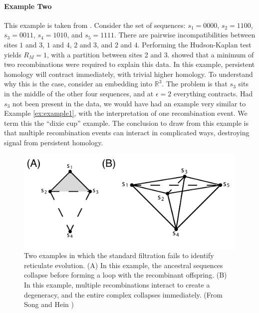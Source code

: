 \paragraph{Example Two}
\label{ex:example2}
%
This example is taken from \citet{Song:2005}.
Consider the set of sequences: $s_{1}=0000$, $s_{2}=1100$, $s_{3}=0011$, $s_{4}=1010$, and $s_{5}=1111$.
There are pairwise incompatibilities between sites $1$ and $3$, $1$ and $4$, $2$ and $3$, and $2$ and $4$.
Performing the Hudson-Kaplan test yields $R_M=1$, with a partition between sites 2 and 3.
\citet{Song:2005} showed that a minimum of two recombinations were required to explain this data.
In this example, persistent homology will contract immediately, with trivial higher homology.
To understand why this is the case, consider an embedding into $\mathbb{R}^3$.
The problem is that $s_{3}$ sits in the middle of the other four sequences, and at $\epsilon=2$ everything contracts.
Had $s_{3}$ not been present in the data, we would have had an example very similar to Example \ref{ex:example1}, with the interpretation of one recombination event.
We term this the ``dixie cup'' example.
The conclusion to draw from this example is that multiple recombination events can interact in complicated ways, destroying signal from persistent homology.

\begin{figure}
\centering
\includegraphics[width=\columnwidth]{./fig/complex_construction/simple_examples_1.pdf}
\caption[Two examples of reduced sensitivity of the Vietoris-Rips Complex]{Two examples in which the standard filtration fails to identify reticulate evolution. (A) In this example, the ancestral sequences collapse before forming a loop with the recombinant offspring. (B) In this example, multiple recombinations interact to create a degeneracy, and the entire complex collapses immediately. (From Song and Hein \cite{Song:2005})}
\label{fig:complex_construction:simple_examples}
\end{figure}

